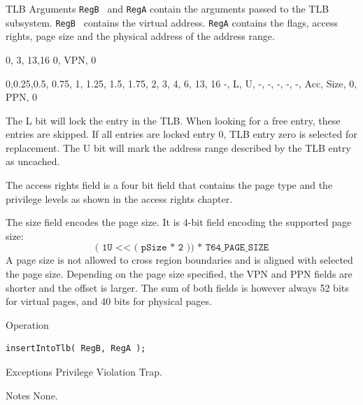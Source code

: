 \begin{iPageDescEntry}{TLB Arguments}
	\texttt{RegB}  and \texttt{RegA} contain the arguments passed to the TLB subsystem. \texttt{RegB}  contains the virtual address. \texttt{RegA} contains the flags, access rights, page size and the physical address of the address range. 
	
	\begin{flushleft}
	\drawInstrFormatSixtyFour
        {0, 3, 13,16}
        {0, VPN, 0}
    \end{flushleft}
    \begin{flushleft}
	\drawInstrFormatSixtyFour
        {0,0.25,0.5, 0.75, 1, 1.25, 1.5, 1.75, 2, 3, 4, 6, 13, 16}
        {-, L, U, -, -, -, -, -, Acc, Size, 0, PPN, 0}
    \end{flushleft}
    
    The L bit will lock the entry in the TLB. When looking for a free entry, these entries are skipped. If all entries are locked entry 0, TLB entry zero is selected for replacement. The U bit will mark the address range described by the TLB entry as uncached.
    
    The access rights field is a four bit field that contains the page type and the privilege levels as shown in the access rights chapter. 
    
     The size field encodes the page size. It is 4-bit field encoding the supported page size: 
     	\[ \texttt{( 1U << ( pSize * 2 )) * T64\_PAGE\_SIZE} \] 
    A page size is not allowed to cross region boundaries and is aligned with selected the page size.
    Depending on the page size specified, the VPN and PPN fields are shorter and the offset is larger. The sum of both fields is however always 52 bits for virtual pages, and 40 bits for physical pages.
\end{iPageDescEntry}

\begin{iPageDescOpEntry}{Operation}
\begin{lstlisting}[style=iPageOpStyle]
insertIntoTlb( RegB, RegA );
\end{lstlisting}
\end{iPageDescOpEntry}

\begin{iPageDescEntry}{Exceptions}
    Privilege Violation Trap.
\end{iPageDescEntry}

\begin{iPageDescEntry}{Notes}
    None.  
\end{iPageDescEntry}
